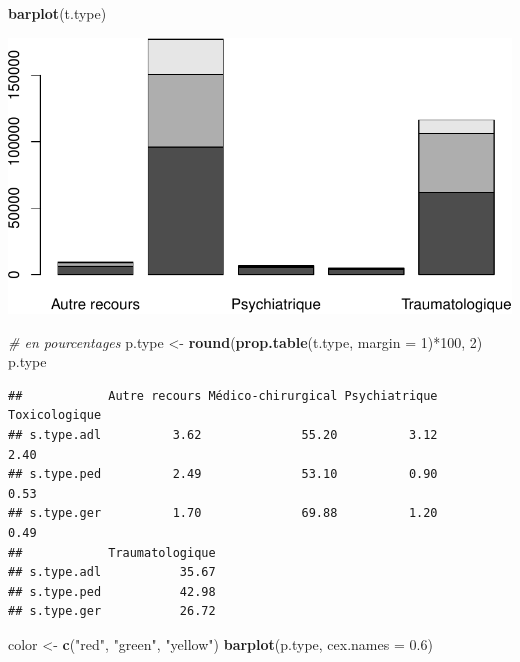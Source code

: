 \documentclass[]{article}
\newenvironment{Shaded}{\begin{snugshade}}{\end{snugshade}}
\newcommand{\KeywordTok}[1]{\textcolor[rgb]{0.13,0.29,0.53}{\textbf{{#1}}}}
\newcommand{\DataTypeTok}[1]{\textcolor[rgb]{0.13,0.29,0.53}{{#1}}}
\newcommand{\DecValTok}[1]{\textcolor[rgb]{0.00,0.00,0.81}{{#1}}}
\newcommand{\FloatTok}[1]{\textcolor[rgb]{0.00,0.00,0.81}{{#1}}}
\newcommand{\StringTok}[1]{\textcolor[rgb]{0.31,0.60,0.02}{{#1}}}
\newcommand{\CommentTok}[1]{\textcolor[rgb]{0.56,0.35,0.01}{\textit{{#1}}}}
\newcommand{\NormalTok}[1]{{#1}}
\begin{document}
\begin{Shaded}
\begin{Highlighting}[]
\KeywordTok{barplot}\NormalTok{(t.type)}
\end{Highlighting}
\end{Shaded}

\includegraphics{analyse_merge_files/figure-latex/synthese-1.pdf}\\

\begin{Shaded}
\begin{Highlighting}[]
\CommentTok{# en pourcentages}
\NormalTok{p.type <-}\StringTok{ }\KeywordTok{round}\NormalTok{(}\KeywordTok{prop.table}\NormalTok{(t.type, }\DataTypeTok{margin =} \DecValTok{1}\NormalTok{)*}\DecValTok{100}\NormalTok{, }\DecValTok{2}\NormalTok{)}
\NormalTok{p.type}
\end{Highlighting}
\end{Shaded}

\begin{verbatim}
##            Autre recours Médico-chirurgical Psychiatrique Toxicologique
## s.type.adl          3.62              55.20          3.12          2.40
## s.type.ped          2.49              53.10          0.90          0.53
## s.type.ger          1.70              69.88          1.20          0.49
##            Traumatologique
## s.type.adl           35.67
## s.type.ped           42.98
## s.type.ger           26.72
\end{verbatim}

\begin{Shaded}
\begin{Highlighting}[]
\NormalTok{color <-}\StringTok{ }\KeywordTok{c}\NormalTok{(}\StringTok{"red"}\NormalTok{, }\StringTok{"green"}\NormalTok{, }\StringTok{"yellow"}\NormalTok{)}
\KeywordTok{barplot}\NormalTok{(p.type, }\DataTypeTok{cex.names =} \FloatTok{0.6}\NormalTok{)}
\end{Highlighting}
\end{Shaded}
\end{document}
